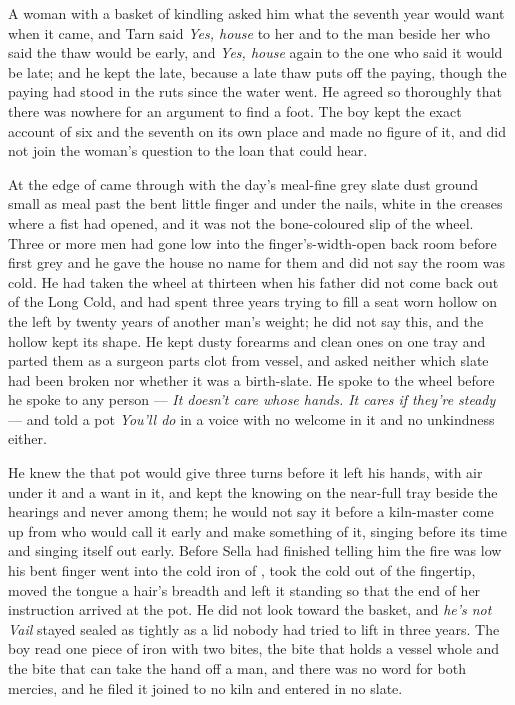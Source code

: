 A woman with a basket of kindling asked him what the seventh year would want when it came, and Tarn said \emph{Yes, house} to her and to the man beside her who said the thaw would be early, and \emph{Yes, house} again to the one who said it would be late; and he kept the late, because a late thaw puts off the paying, though the paying had stood in the ruts since the water went. He agreed so thoroughly that there was nowhere for an argument to find a foot. The boy kept the exact account of six and the seventh on its own place and made no figure of it, and did not join the woman's question to the loan that could hear.

At the edge of   came through with the day's meal-fine grey slate dust ground small as meal past the bent little finger and under the nails, white in the creases where a fist had opened, and it was not the bone-coloured slip of the wheel. Three or more men had gone low into the finger's-width-open back room before first grey and he gave the house no name for them and did not say the room was cold. He had taken the wheel at thirteen when his father did not come back out of the Long Cold, and had spent three years trying to fill a seat worn hollow on the left by twenty years of another man's weight; he did not say this, and the hollow kept its shape. He kept dusty forearms and clean ones on one tray and parted them as a surgeon parts clot from vessel, and asked neither which slate had been broken nor whether it was a birth-slate. He spoke to the wheel before he spoke to any person --- \emph{It doesn't care whose hands. It cares if they're steady} --- and told a pot \emph{You'll do} in a voice with no welcome in it and no unkindness either.

He knew the  that pot would give three turns before it left his hands, with air under it and a want in it, and kept the knowing on the near-full tray beside the hearings and never among them; he would not say it before a kiln-master come up from  who would call it early and make something of it, singing before its time and singing itself out early. Before Sella had finished telling him the fire was low his bent finger went into the cold iron of , took the cold out of the fingertip, moved the tongue a hair's breadth and left it standing so that the end of her instruction arrived at the pot. He did not look toward the basket, and \emph{he's not Vail} stayed sealed as tightly as a lid nobody had tried to lift in three years. The boy read one piece of iron with two bites, the bite that holds a vessel whole and the bite that can take the hand off a man, and there was no  word for both mercies, and he filed it joined to no kiln and entered in no slate.

